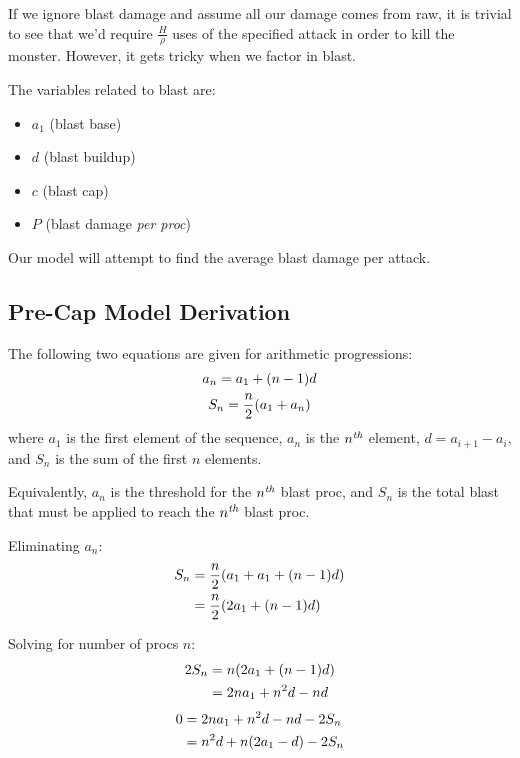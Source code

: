 \documentclass{article}
\begin{document}
If we ignore blast damage and assume all our damage comes from raw, it is trivial to see that we'd require $\frac{H}{\rho}$ uses of the specified attack in order to kill the monster. However, it gets tricky when we factor in blast.

The variables related to blast are:
\begin{itemize}
    \item $a_1$ (blast base)
    \item $d$ (blast buildup)
    \item $c$ (blast cap)
    \item $P$ (blast damage \textit{per proc})
\end{itemize}

Our model will attempt to find the average blast damage per attack.


\subsection{Pre-Cap Model Derivation}%
\label{sub:pre_cap_model_derivation}

The following two equations are given for arithmetic progressions:
\begin{gather}
    a_n = a_1 + \parens*{n - 1} d \\
    S_n = \frac{n}{2} \parens*{a_1 + a_n}
\end{gather}
where $a_1$ is the first element of the sequence, $a_n$ is the ${n}^\textit{th}$ element, $d = a_{i+1} - a_{i}$, and $S_n$ is the sum of the first $n$ elements.

Equivalently, $a_n$ is the threshold for the ${n}^\textit{th}$ blast proc, and $S_n$ is the total blast that must be applied to reach the ${n}^\textit{th}$ blast proc.

Eliminating $a_n$:
\begin{align}
    S_n &= \frac{n}{2} \parens*{a_1 + a_1 + \parens*{n - 1} d} \\
        &= \frac{n}{2} \parens*{2 a_1 + \parens*{n - 1} d}
\end{align}

Solving for number of procs $n$:
\begin{align}
    2 S_n &= n \parens*{2 a_1 + \parens*{n - 1} d} \\
          &= 2 n a_1 + n^2 d - n d
\end{align}
\begin{align}
    0 &= 2 n a_1 + n^2 d - n d - 2 S_n \\
      &= n^2 d + n \parens*{2 a_1 - d} - 2 S_n
\end{align}
\end{document}
